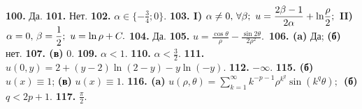 \documentclass[a4paper]{article}
\def\a{\alpha}
\def\b{\beta}
\begin{document}
{\bf 100.} Да.
{\bf 101.} Нет.
{\bf 102.} $\a\in\{-\displaystyle{\frac{3}{4}};0\}.$
{\bf 103. I)} $\a\neq 0,\, \forall \b;\ u=\displaystyle{\frac{2\b-1}{2\a}}
+\hbox{ln}\displaystyle{\frac{\rho}{2}};$\
    {\bf II)} $\a=0,\, \b=\displaystyle{\frac{1}{2}};\
    u=\hbox{ln}\,\rho+C.$
{\bf 104.} Да.
{\bf 105.} $u=\displaystyle{\frac{\cos\theta}{\rho}}-
\displaystyle{\frac{\sin2\theta}{2\rho^2}}.$\
{\bf 106. (a)} Да;
    {\bf (б)} нет.
{\bf 107. (в)} $0.$
{\bf 109.} $\a<1$.
{\bf 110.} $\a<\displaystyle{\frac{3}{2}}.$
{\bf 111.} $u(0,y)=2+(y-2)\ln(2-y) -y\ln(-y)$.
{\bf 112.} $-\infty$.
{\bf 115. (б)} $u(x)\equiv1$;
     {\bf (в)} $u(x)\equiv1$.
{\bf 116. (a)} $u(\rho,\theta)=\sum\limits_{k=1}^{\infty}k^{-p-1}
\rho^{k^q}\sin(k^q\theta);$\
     {\bf (б)} $q<2p+1.$
{\bf 117.} $\displaystyle{\frac{\pi}{2}}.$
\end{document}
